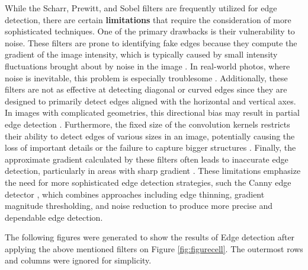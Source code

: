 \documentclass[%
	a4paper, %
	12pt, %
	english, %
	bibtotoc %
]{scrartcl}
\begin{document}
While the Scharr, Prewitt, and Sobel filters are frequently utilized for edge detection, there are certain \textbf{limitations} that require the consideration of more sophisticated techniques. One of the primary drawbacks is their vulnerability to noise. These filters are prone to identifying fake edges because they compute the gradient of the image intensity, which is typically caused by small intensity fluctuations brought about by noise in the image \cite{gonzalez_digital_image_processing}. In real-world photos, where noise is inevitable, this problem is especially troublesome . Additionally, these filters are not as effective at detecting diagonal or curved edges since they are designed to primarily detect edges aligned with the horizontal and vertical axes. In images with complicated geometries, this directional bias may result in partial edge detection \cite{jain_machine_vision}. Furthermore, the fixed size of the convolution kernels restricts their ability to detect edges of various sizes in an image, potentially causing the loss of important details or the failure to capture bigger structures \cite{marr_edge_detection_theory}. Finally, the approximate gradient calculated by these filters often leads to inaccurate edge detection, particularly in areas with sharp gradient \cite{canny_computational_approach}. These limitations emphasize the need for more sophisticated edge detection strategies, such the Canny edge detector \cite{canny_computational_approach}, which combines approaches including edge thinning, gradient magnitude thresholding, and noise reduction to produce more precise and dependable edge detection. 

The following figures were generated to show the results of Edge detection after applying the above mentioned filters on Figure \ref{fig:figurecell}. The outermost rows and columns were ignored for simplicity. 
\end{document}
